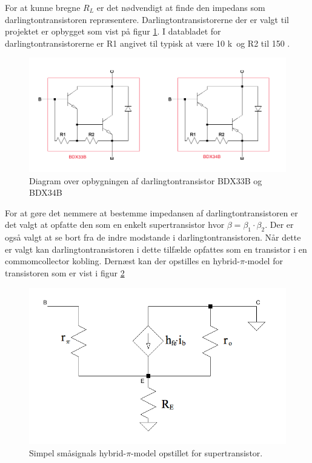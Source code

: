 For at kunne bregne $R_L$ er det nødvendigt at finde den impedans som darlingtontransistoren repræsentere. Darlingtontransistorerne der er valgt til projektet er opbygget som vist på figur \ref{darlington_diagram}. I databladet for darlingtontransistorerne   er R1 angivet til typisk at være 10 k\ohm~og R2 til 150 \ohm.

\begin{figure}[h]
\centering
\includegraphics[width=\textwidth]{teknisk/effektforstaerker/darlingtontransistor_opbygning.png}
\caption{Diagram over opbygningen af darlingtontransistor BDX33B og BDX34B}
\label{darlington_diagram}
\end{figure}

For at gøre det nemmere at bestemme impedansen af darlingtontransistoren er det valgt at opfatte den som en enkelt supertransistor hvor $\beta = \beta_1 \cdot \beta_2$. Der er også valgt at se bort fra de indre modstande i darlingtontransistoren. Når dette er valgt kan darlingtontransistoren i dette tilfælde opfattes som en transistor i en commomcollector kobling. Dernæst kan der opstilles en hybrid-$\pi$-model for transistoren som er vist i figur \ref{hybridpimodel_darlington} 

\begin{figure}[h]
\centering
\includegraphics[scale=0.3]{teknisk/effektforstaerker/hybridpimodel.png}
\caption{Simpel småsignals hybrid-$\pi$-model  opstillet for supertransistor.}
\label{hybridpimodel_darlington}
\end{figure}

